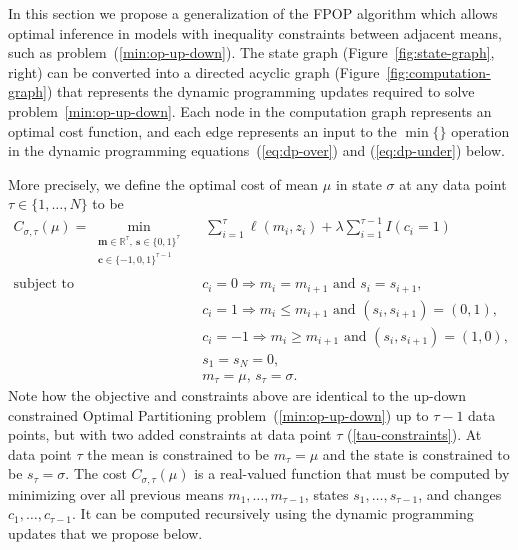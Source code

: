 \documentclass[article]{jss}
\newcommand{\RR}{\mathbb R}
\begin{document}
In this section we propose a generalization of the FPOP algorithm
\citep{Maidstone2016} which allows optimal inference in models with
inequality constraints between adjacent means, such as
problem~(\ref{min:op-up-down}). The state graph
(Figure~\ref{fig:state-graph}, right) can be converted into a directed
acyclic graph (Figure~\ref{fig:computation-graph}) that represents the
dynamic programming updates required to solve
problem~\ref{min:op-up-down}. Each node in the computation graph
represents an optimal cost function, and each edge represents an input
to the $\min\{\}$ operation in the dynamic programming
equations~(\ref{eq:dp-over}) and (\ref{eq:dp-under}) below.

More precisely, we define the optimal cost of mean $\mu$ in state
$\sigma$ at any data point $\tau\in\{1,\dots,N\}$ to be
\begin{align}
  \label{eq:C_sigma_tau}
   C_{\sigma,\tau}(\mu)=\min_{
  \substack{
  \mathbf m\in\RR^\tau,\ \mathbf s\in\{0, 1\}^\tau\\
  \mathbf c\in\{-1, 0,1\}^{\tau-1}\\
  }
  } &\ \ 
      \sum_{i=1}^\tau \ell(m_i, z_i) + \lambda \sum_{i=1}^{\tau-1} I(c_i = 1) \\
  \text{subject to\ \ } &\ c_i = 0 \Rightarrow m_i = m_{i+1}\text{ and }s_i=s_{i+1}, \nonumber\\
    &\ c_i = 1 \Rightarrow m_i \leq m_{i+1}\text{ and }(s_i,s_{i+1})=(0,1),\nonumber\\
    &\ c_i = -1 \Rightarrow m_i \geq m_{i+1}\text{ and }(s_i,s_{i+1})=(1,0),\nonumber\\
  & \  s_1=s_N=0,\nonumber\\
& \ m_\tau=\mu,\, s_\tau=\sigma.\label{tau-constraints}
\end{align}
Note how the objective and constraints above are identical to the
up-down constrained Optimal Partitioning
problem~(\ref{min:op-up-down}) up to $\tau-1$ data points, but with
two added constraints at data point $\tau$ (\ref{tau-constraints}). At
data point $\tau$ the mean is constrained to be $m_\tau=\mu$ and the
state is constrained to be $s_\tau=\sigma$. The cost
$C_{\sigma,\tau}(\mu)$ is a real-valued function that must be computed
by minimizing over all previous means $m_1,\dots,m_{\tau-1}$, states
$s_1,\dots,s_{\tau-1}$, and changes $c_1,\dots,c_{\tau-1}$.
It can be computed recursively using the dynamic programming
updates that we propose below.
\end{document}
